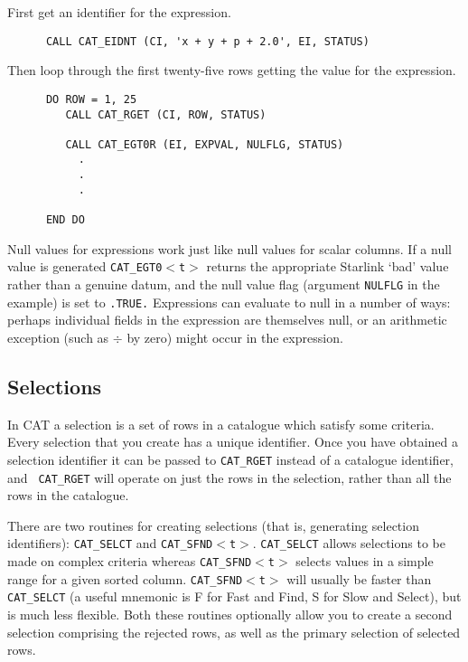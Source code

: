 First get an identifier for the expression.

\begin{verbatim}
      CALL CAT_EIDNT (CI, 'x + y + p + 2.0', EI, STATUS)
\end{verbatim}

Then loop through the first twenty-five rows getting the value for the
expression.

\begin{verbatim}
      DO ROW = 1, 25
         CALL CAT_RGET (CI, ROW, STATUS)

         CALL CAT_EGT0R (EI, EXPVAL, NULFLG, STATUS)
           .
           .
           .

      END DO
\end{verbatim}

Null values for expressions work just like null values for scalar 
columns. If a null value is generated {\tt CAT\_EGT0$<$t$>$} returns
the appropriate Starlink `bad' value rather than a genuine datum, and
the null value flag (argument {\tt NULFLG} in the example) is set to
{\tt .TRUE.} Expressions can evaluate to null in a number of ways: 
perhaps individual fields in the expression are themselves null, or
an arithmetic exception (such as $\div$ by zero) might occur in the
expression.


\subsection{Selections}

In CAT a selection is a set of rows in a catalogue which satisfy some
criteria. Every selection that you create has a unique identifier.
Once you have obtained a selection identifier it can be passed to
{\tt CAT\_RGET} instead of a catalogue identifier, and {\tt
CAT\_RGET} will operate on just the rows in the selection, rather than
all the rows in the catalogue.

There are two routines for creating selections (that is, generating
selection identifiers): {\tt CAT\_SELCT} and {\tt CAT\_SFND$<$t$>$}.
{\tt CAT\_SELCT} allows selections to be made on complex criteria
whereas {\tt CAT\_SFND$<$t$>$} selects values in a simple range for a 
given sorted column. {\tt CAT\_SFND$<$t$>$} will usually be faster than 
{\tt CAT\_SELCT} (a useful mnemonic is F for Fast and Find, S for Slow 
and Select), but is much less flexible. Both these routines optionally
allow you to create a second selection comprising the rejected rows,
as well as the primary selection of selected rows.

